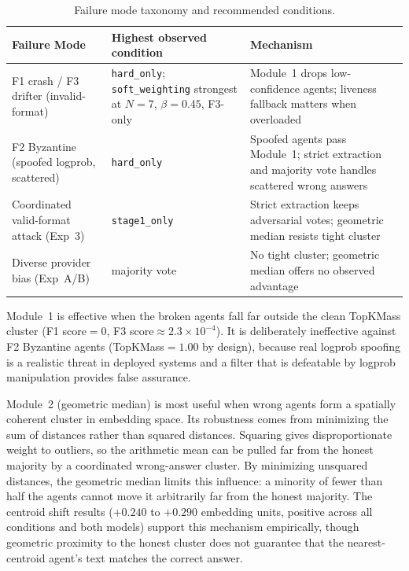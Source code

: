 \documentclass[11pt]{article}
\begin{document}
\begin{table}[h]
\centering
\caption{Failure mode taxonomy and recommended conditions.}
\label{tab:failure-modes}
\small
\begin{tabular}{p{3.5cm}p{3.5cm}p{5cm}}
\toprule
\textbf{Failure Mode}
  & \textbf{Highest observed condition}
  & \textbf{Mechanism} \\
\midrule
F1 crash / F3 drifter (invalid-format)
  & \texttt{hard\_only}; \texttt{soft\_weighting} strongest at $N=7$,
    $\beta=0.45$, F3-only
  & Module~1 drops low-confidence agents; liveness fallback matters
    when overloaded \\[6pt]
F2 Byzantine (spoofed logprob, scattered)
  & \texttt{hard\_only}
  & Spoofed agents pass Module~1; strict extraction and majority vote
    handles scattered wrong answers \\[6pt]
Coordinated valid-format attack (Exp~3)
  & \texttt{stage1\_only}
  & Strict extraction keeps adversarial votes; geometric median resists
    tight cluster \\[6pt]
Diverse provider bias (Exp~A/B)
  & majority vote
  & No tight cluster; geometric median offers no observed advantage \\
\bottomrule
\end{tabular}
\end{table}

Module~1 is effective when the broken agents fall far outside the clean TopKMass
cluster (F1 score$=0$, F3 score${\approx}2.3\times10^{-4}$). It is deliberately
ineffective against F2 Byzantine agents (TopKMass$=1.00$ by design), because
real logprob spoofing is a realistic threat in deployed systems and a filter that
is defeatable by logprob manipulation provides false assurance.

Module~2 (geometric median) is most useful when wrong agents form a spatially
coherent cluster in embedding space. Its robustness comes from minimizing the sum
of distances rather than squared distances. Squaring gives disproportionate
weight to outliers, so the arithmetic mean can be pulled far from the honest
majority by a coordinated wrong-answer cluster. By minimizing unsquared
distances, the geometric median limits this influence: a minority of fewer than
half the agents cannot move it arbitrarily far from the honest majority. The
centroid shift results ($+0.240$ to $+0.290$ embedding units, positive across
all conditions and both models) support this mechanism empirically, though
geometric proximity to the honest cluster does not guarantee that the
nearest-centroid agent's text matches the correct answer.
\end{document}
